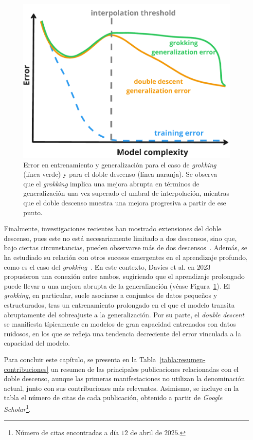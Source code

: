 \begin{figure}[h]
    \centering
    \includegraphics[width=0.6\linewidth]{img/grokking.png}
    \caption[\textit{Grokking} y \textit{Deep Double Descent}.]{Error en entrenamiento y generalización para el caso de \textit{grokking} (línea verde) y para el doble descenso (línea naranja). Se observa que el \textit{grokking} implica una mejora abrupta en términos de generalización una vez superado el umbral de interpolación, mientras que el doble descenso muestra una mejora progresiva a partir de ese punto.}\label{fig:grokking}
\end{figure}

Finalmente, investigaciones recientes han mostrado extensiones del doble descenso, pues este no está necesariamente limitado a dos descensos, sino que, bajo ciertas circunstancias, pueden observarse más de dos descensos~\cite{d_Ascoli2021, Chen2021}. Además, se ha estudiado su relación con otros sucesos emergentes en el aprendizaje profundo, como es el caso del \emph{grokking}~\cite{Power2022}. En este contexto, Davies et al. en $2023$~\cite{Davies2023} propusieron una conexión entre ambos, sugiriendo que el aprendizaje prolongado puede llevar a una mejora abrupta de la generalización (véase Figura~\ref{fig:grokking}). El \textit{grokking}, en particular, suele asociarse a conjuntos de datos pequeños y estructurados, tras un entrenamiento prolongado en el que el modelo transita abruptamente del sobreajuste a la generalización. Por su parte, el \textit{double descent} se manifiesta típicamente en modelos de gran capacidad entrenados con datos ruidosos, en los que se refleja una tendencia decreciente del error vinculada a la capacidad del modelo.

Para concluir este capítulo, se presenta en la Tabla~\ref{tabla:resumen-contribuciones} un resumen de las principales publicaciones relacionadas con el doble descenso, aunque las primeras manifestaciones no utilizan la denominación actual, junto con sus contribuciones más relevantes. Asimismo, se incluye en la tabla el número de citas de cada publicación, obtenido a partir de \textit{Google Scholar}\footnote{Número de citas encontradas a día $12$ de abril de $2025$.}.

